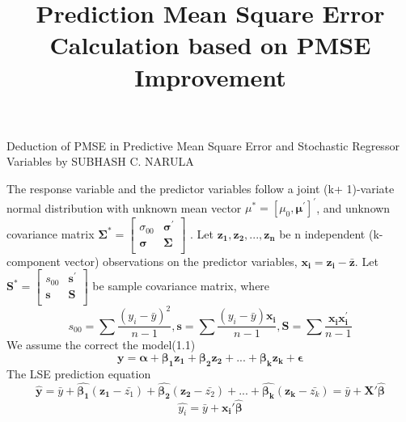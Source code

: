 \documentclass[11pt]{article}
\begin{document}
\thispagestyle{fancy}

\title{\bf Prediction Mean Square Error Calculation based on PMSE Improvement}
\date{}
\maketitle
% 
%
%
%
%
%


Deduction of PMSE in Predictive Mean Square Error and
 Stochastic Regressor Variables by  SUBHASH C. NARULA

The response variable and the predictor variables follow a joint
 (k+ 1)-variate normal distribution with unknown mean vector $\mu^{*}=[\mu_{0},\boldsymbol{\mu^{'}}]^{'}$, and unknown covariance matrix 
$ \boldsymbol{\Sigma^{*}}  =    
 \begin{bmatrix} 
    \sigma_{00} & \boldsymbol{\sigma^{'}} \\  
    \boldsymbol{\sigma} & \boldsymbol{\Sigma} \\  
\end{bmatrix}$ . Let $\boldsymbol {z_1, z_2,..., z_n}$ be n independent (k-component vector) observations on the predictor variables, $\boldsymbol{x_i=z_i-\bar{z}}$. Let $ \boldsymbol{S^{*}}  =    
 \begin{bmatrix} 
    s_{00} & \boldsymbol{s^{'}} \\  
    \boldsymbol{s} & \boldsymbol{S} \\  
\end{bmatrix}$ be sample covariance matrix, where 
$$s_{00}=\sum{\frac{(y_i-\bar{y})^2}{n-1}},\boldsymbol{s}=\sum{\frac{(y_i-\bar{y})\boldsymbol{x_i}}{n-1}}, \boldsymbol{S}=\sum{\frac{\boldsymbol{x_{i}x_{i}^{'}}}{n-1}}
$$
We assume the correct the model(1.1)
$$\boldsymbol{y=\alpha+ \beta_1z_1+\beta_2z_2+...+\beta_kz_k+\epsilon}$$
The LSE prediction equation 
$$
\boldsymbol{\hat{y}}=\bar{y}+\boldsymbol{\hat{\beta_1}}(\boldsymbol{z_1}-\bar{z_1})+\boldsymbol{\hat{\beta_2}}(\boldsymbol{z_2}-\bar{z_2})+...+\boldsymbol{\hat{\beta_k}}(\boldsymbol{z_k}-\bar{z_k})=\bar{y}+\boldsymbol{X'\hat{\beta}}$$
$$\hat{y_i}=\bar{y}+\boldsymbol{x_{i}'\hat{\beta}}
$$
\end{document}
